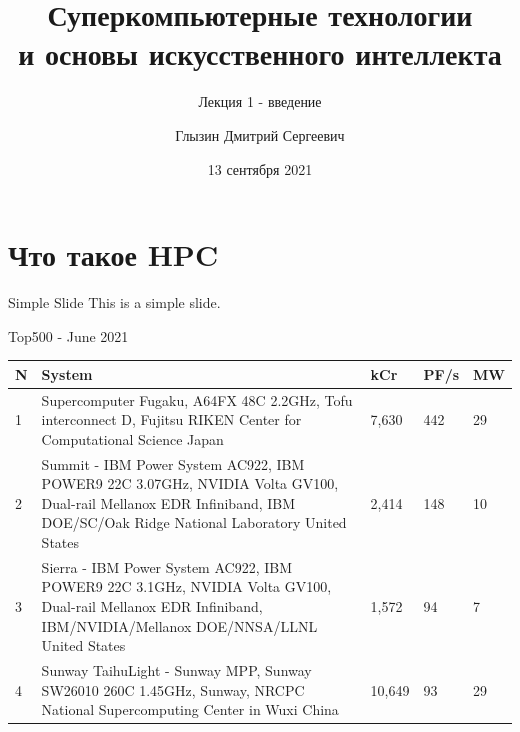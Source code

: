 \documentclass{beamer}
\title{Суперкомпьютерные технологии \\и основы искусственного интеллекта}
\subtitle{Лекция 1 - введение}
\author{Глызин Дмитрий Сергеевич}
\institute{Ярославский государственный \\университет им. П.Г. Демидова}
\date{13 сентября 2021}
\begin{document}

\begin{frame}
	\maketitle %
\end{frame}


\section{Что такое HPC} %


\begin{frame}{Simple Slide}
	This is a simple slide.
\end{frame}


\begin{frame}{Top500 - June 2021}
	\begin{table}
		\centering %
\small		
                \begin{tabular}{p{0.1cm} p{8cm} p{0.7cm} p{0.5cm} p{0.5cm}}

			N  &  System & kCr & PF/s & MW\\
			\toprule
			1 &   Supercomputer Fugaku, A64FX 48C 2.2GHz, Tofu interconnect D, Fujitsu 
RIKEN Center for Computational Science Japan &  7,630 & 442 &29\\
			\midrule
			 2 &    Summit - IBM Power System AC922, IBM POWER9 22C 3.07GHz, NVIDIA Volta GV100, Dual-rail Mellanox EDR Infiniband, IBM
DOE/SC/Oak Ridge National Laboratory United States   & 2,414 & 148 &10\\
			\midrule
                            3 &  Sierra - IBM Power System AC922, IBM POWER9 22C 3.1GHz, NVIDIA Volta GV100, Dual-rail Mellanox EDR Infiniband, IBM/NVIDIA/Mellanox DOE/NNSA/LLNL United States  & 1,572 & 94 & 7 \\
			\midrule
			4 &   Sunway TaihuLight - Sunway MPP, Sunway SW26010 260C 1.45GHz, Sunway, NRCPC National Supercomputing Center in Wuxi
			China  &  10,649 & 93 &29\\
		\end{tabular}
	\end{table}
\end{frame}
\end{document}

